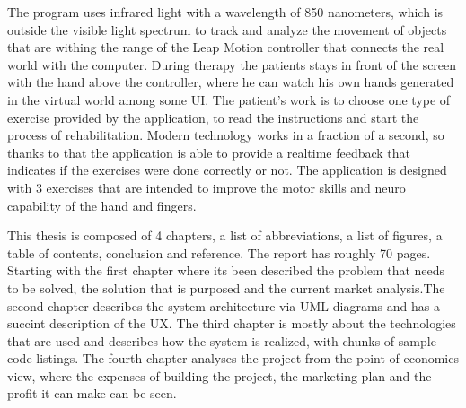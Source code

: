 The program uses infrared light with a wavelength of 850 nanometers, which is outside the visible light spectrum
to track and analyze the movement of objects that are withing the range of the Leap Motion controller that connects the real world with the computer. During therapy the patients stays in front of the screen with the hand above the controller, where he can watch his own hands generated in the virtual world among some UI. The patient's work is to choose one type of exercise provided by the application, to read the instructions and start the process of rehabilitation. Modern technology works in a fraction of a second, so thanks to that the application is able to provide a realtime feedback that indicates if the exercises were done correctly or not. The application is designed with 3 exercises that are intended to improve the motor skills and neuro capability of the hand and fingers.

This thesis is composed of 4 chapters, a list of abbreviations, a list of figures, a table of contents, conclusion and reference. The report has roughly 70 pages. Starting with the first chapter where its been described the problem that needs to be solved, the solution that is purposed and the current market analysis.The second chapter describes the system architecture via UML diagrams and has a succint description of the UX. The third chapter is mostly about the technologies that are used and describes how the system is realized, with chunks of sample code listings.  The fourth chapter analyses the project from the point of economics view, where the expenses of building the project, the marketing plan and the profit it can make can be seen. 